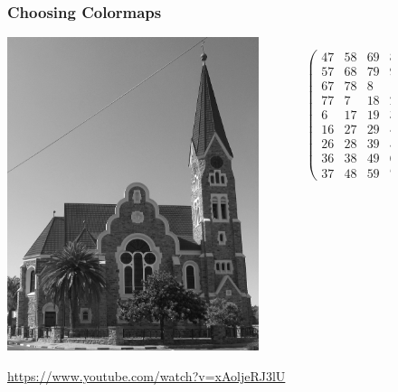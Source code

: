 \documentclass{beamer}
\begin{document}
\begin{frame}
\begin{figure}
    \frametitle{Choosing Colormaps}
    \begin{columns}
	\begin{column}{0.5\textwidth}
		\begin{center}
		\includegraphics[width=0.9\textwidth]{../testimage.jpg}
		\end{center}
	\end{column}
	\begin{column}{0.5\textwidth}
		\tiny{
		\begin{equation*}
		\begin{pmatrix}
		47 & 58 & 69 & 80 & 1 & 12 & 23 & 34 & 45 \\
    	57 & 68 & 79 & 9 & 11 & 22 & 33 & 44 & 46 \\
    	67 & 78 & 8 & 10 & 21 & 32 & 43 & 54 & 56 \\
    	77 & 7 & 18 & 20 & 31 & 42 & 53 & 55 & 66 \\
    	6 & 17 & 19 & 30 & 41 & 52 & 63 & 65 & 76 \\
    	16 & 27 & 29 & 40 & 51 & 62 & 64 & 75 & 5 \\
    	26 & 28 & 39 & 50 & 61 & 72 & 74 & 4 & 15 \\
    	36 & 38 & 49 & 60 & 71 & 73 & 3 & 14 & 25 \\
    	37 & 48 & 59 & 70 & 81 & 2 & 13 & 24 & 35
		\end{pmatrix}
		\end{equation*}
		}
	\end{column}
	\end{columns}
	\begin{center}
	\tiny{\url{https://www.youtube.com/watch?v=xAoljeRJ3lU}}
	\end{center}
\end{figure}
\end{frame}
\end{document}
